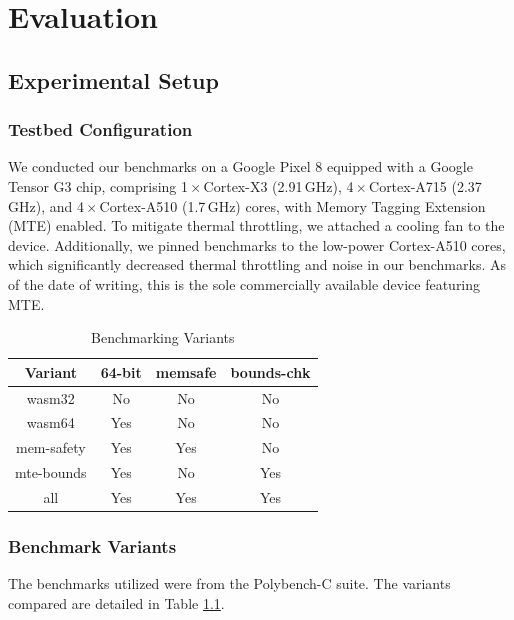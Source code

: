 \chapter{Evaluation}
\label{ch:eval}

\section{Experimental Setup}\label{sec:experimental-setup}

\subsection{Testbed Configuration}\label{subsec:testbed-configuration}
We conducted our benchmarks on a Google Pixel 8 equipped with a Google Tensor G3 chip, comprising 1\,$\times$\,Cortex-X3 (2.91\,GHz), 4\,$\times$\,Cortex-A715 (2.37\,GHz), and 4\,$\times$\,Cortex-A510 (1.7\,GHz) cores, with Memory Tagging Extension (MTE) enabled.
To mitigate thermal throttling, we attached a cooling fan to the device.
Additionally, we pinned benchmarks to the low-power Cortex-A510 cores, which significantly decreased thermal throttling and noise in our benchmarks. 
As of the date of writing, this is the sole commercially available device featuring MTE.

\begin{table}[ht]
    \centering
    \small
    \begin{tabular}{c || c c c}
        \hline
        \textbf{Variant} & \textbf{64-bit} & \textbf{memsafe} & \textbf{bounds-chk} \\
        \hline
        wasm32           & No              & No               & No                  \\
        wasm64           & Yes             & No               & No                  \\
        mem-safety       & Yes             & Yes              & No                  \\
        mte-bounds       & Yes             & No               & Yes                 \\
        all              & Yes             & Yes              & Yes                 \\
        \hline
    \end{tabular}
    \caption{Benchmarking Variants}
    \label{tab:benchmark-variants}
\end{table}

\subsection{Benchmark Variants}\label{subsec:benchmark-variants}
The benchmarks utilized were from the Polybench-C suite.
The variants compared are detailed in Table \ref{tab:benchmark-variants}.

